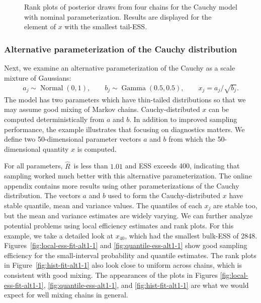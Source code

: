 \documentclass[american,]{article}
\DeclareMathOperator{\N}{Normal}
\DeclareMathOperator{\Gam}{Gamma}
\newcommand{\Rhat}{$\widehat{R}$}
\theoremstyle{definition}
\begin{document}
\begin{figure}[tp]
\begin{minipage}{0.48\textwidth}
  \caption{Rank plots of posterior draws from four chains for the Cauchy model 
  with nominal parameterization. Results are displayed for the element of 
  $x$ with the smallest tail-ESS.}
  \label{fig:hist-fit-nom-1}
\end{minipage}
\end{figure}

\hypertarget{alternative-parameterization-of-the-cauchy-distribution}{%
\subsubsection*{Alternative parameterization of the
Cauchy distribution}\label{alternative-parameterization-of-the-cauchy-distribution}}

Next, we examine an alternative parameterization  of the
Cauchy as a scale mixture of Gaussians:
\begin{align}
  a_j \sim  \N(0,1), \qquad
  b_j \sim  \Gam (0.5, 0.5), \qquad
  x_j =  a_j/\sqrt{b_j}.
\end{align}
The model has two parameters which have thin-tailed distributions so that we may
assume good mixing of Markov chains. Cauchy-distributed \(x\) can be
computed deterministically from \(a\) and \(b\). In addition to improved sampling 
performance, the example illustrates that focusing on diagnostics matters.
We define two 50-dimensional parameter vectors $a$ and $b$ from which
the 50-dimensional quantity $x$ is computed.

For all parameters, \Rhat\ is less than \(1.01\) and 
ESS exceeds 400, indicating that
sampling worked much better with this alternative parameterization.
The online appendix contains more results using other parameterizations 
of the Cauchy distribution. The vectors \(a\) and \(b\) used
to form the Cauchy-distributed \(x\) have stable quantile, mean and
variance values. The quantiles of each \(x_j\) are stable too, but the mean 
and variance estimates are widely varying.
%
We can further analyze potential problems using local efficiency
estimates and rank plots. For this example, we take a detailed look at 
\(x_{40}\), which had the smallest bulk-ESS of 2848.
%
Figures~\ref{fig:local-ess-fit-alt1-1} and
\ref{fig:quantile-ess-alt1-1} show good sampling efficiency for the
small-interval probability and quantile estimates.
%
The rank plots in Figure~\ref{fig:hist-fit-alt1-1} also look close to
uniform across chains, which is consistent with good mixing.
The appearances of the plots in Figures \ref{fig:local-ess-fit-alt1-1},
\ref{fig:quantile-ess-alt1-1}, and \ref{fig:hist-fit-alt1-1} are what
we would expect for well mixing chains in general.
\end{document}
